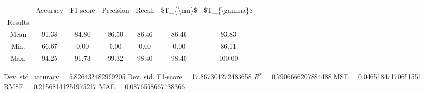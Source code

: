 \begin{tabular}{|c|c|c|c|c|c|c|}
\toprule
{} &  Accuracy &  F1 score &  Precision &  Recall &  \$T\_\{\textbackslash mu\}\$ &  \$T\_\{\textbackslash gamma\}\$ \\
Results &           &           &            &         &            &               \\
\hline
Mean    &     91.38 &     84.80 &      86.50 &   86.46 &      86.46 &         93.83 \\
Min.    &     66.67 &      0.00 &       0.00 &    0.00 &       0.00 &         86.11 \\
Max.    &     94.25 &     91.73 &      99.32 &   98.40 &      98.40 &        100.00 \\
\bottomrule
\end{tabular}

 Dev. std. accuracy = 5.826432482999205
 Dev. std. F1-score = 17.867301272483658
 $R^2$ = 0.7906666207884488
 MSE = 0.04651847170651551
 RMSE = 0.21568141251975217
 MAE = 0.0876568667738366